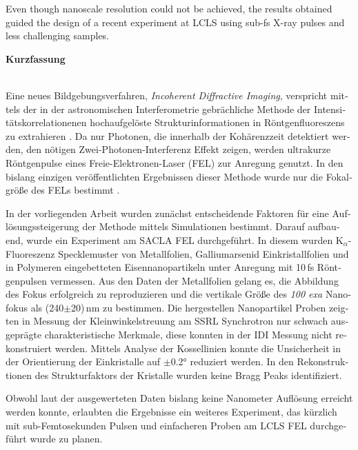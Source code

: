 Even though nanoscale resolution could not be achieved, the results obtained guided the design of a recent experiment at LCLS using sub-fs X-ray pulses and less challenging samples.





\clearpage
 
 \begin{otherlanguage}{german}
 \begin{Huge}
 	\textbf{Kurzfassung}\vspace{12mm}
 \end{Huge}
\\
Eine neues Bildgebungsverfahren, \textit{Incoherent Diffractive Imaging}, verspricht mittels der in der  astronomischen Interferometrie gebrächliche Methode der Intensitätskorrelationenen  hochaufgelöste Strukturinformationen in Röntgenfluoreszens zu extrahieren \cite{classen2017}. Da nur Photonen, die innerhalb der Kohärenzzeit detektiert werden, den nötigen Zwei-Photonen-Interferenz  Effekt zeigen, werden ultrakurze Röntgenpulse eines Freie-Elektronen-Laser (FEL) zur Anregung genutzt.  In den bislang einzigen veröffentlichten Ergebnissen dieser Methode wurde nur die Fokalgröße des FELs bestimmt \cite{nakumura2020}.

In der vorliegenden Arbeit wurden zunächst entscheidende Faktoren für eine Auflösungssteigerung der Methode mittels Simulationen bestimmt. Darauf aufbauend, wurde ein Experiment am SACLA FEL durchgeführt. In diesem wurden K$_\alpha$-Fluoreszenz Specklemuster von Metallfolien, Galliumarsenid Einkristallfolien und in Polymeren eingebetteten Eisennanopartikeln unter Anregung mit 10\,fs Röntgenpulsen vermessen. Aus den Daten der Metallfolien gelang es, die Abbildung des Fokus erfolgreich zu reproduzieren und die vertikale Größe des \textit{100 exa} Nanofokus als (240$\pm$20)\,nm zu bestimmen. Die hergestellen Nanopartikel Proben zeigten in Messung der Kleinwinkelstreuung am SSRL Synchrotron nur schwach ausgeprägte charakteristische Merkmale, diese konnten in der IDI Messung nicht rekonstruiert werden. Mittels Analyse der Kossellinien konnte die Unsicherheit in der Orientierung der Einkristalle auf $\pm$0.2° reduziert werden. In den Rekonstruktionen des Strukturfaktors der Kristalle wurden keine Bragg Peaks identifiziert.

Obwohl laut der ausgewerteten Daten bislang keine Nanometer Auflösung erreicht werden konnte, erlaubten die Ergebnisse ein weiteres Experiment, das kürzlich mit sub-Femtosekunden Pulsen und einfacheren Proben am  LCLS FEL durchgeführt wurde zu planen.
\end{otherlanguage}